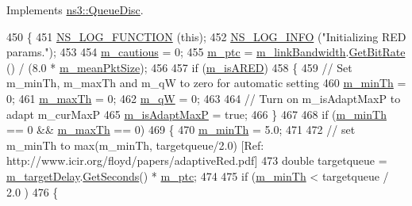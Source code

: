 Implements \hyperlink{classns3_1_1QueueDisc_a600ed3e7110b9d506b28ad62beb84592}{ns3\+::\+Queue\+Disc}.


\begin{DoxyCode}
450 \{
451   \hyperlink{log-macros-disabled_8h_a90b90d5bad1f39cb1b64923ea94c0761}{NS\_LOG\_FUNCTION} (\textcolor{keyword}{this});
452   \hyperlink{group__logging_gafbd73ee2cf9f26b319f49086d8e860fb}{NS\_LOG\_INFO} (\textcolor{stringliteral}{"Initializing RED params."});
453 
454   \hyperlink{classns3_1_1RedQueueDisc_a2156a26538fe0259220ca9e57c829c34}{m\_cautious} = 0;
455   \hyperlink{classns3_1_1RedQueueDisc_aa0e1d78172897574d39e59b873ec9401}{m\_ptc} = \hyperlink{classns3_1_1RedQueueDisc_a036e8100b2bc17d9b7c3bf5184126f95}{m\_linkBandwidth}.\hyperlink{classns3_1_1DataRate_a88e27dcc6e633584dac99fa5988612bc}{GetBitRate} () / (8.0 * 
      \hyperlink{classns3_1_1RedQueueDisc_a70edac67edac4ce7c4a7d4325cf1e409}{m\_meanPktSize});
456 
457   \textcolor{keywordflow}{if} (\hyperlink{classns3_1_1RedQueueDisc_a27b33901dccd8e52d8cbe9798ea70139}{m\_isARED})
458     \{
459       \textcolor{comment}{// Set m\_minTh, m\_maxTh and m\_qW to zero for automatic setting}
460       \hyperlink{classns3_1_1RedQueueDisc_a6c2f13710a589ca7a43e06d16bd889ee}{m\_minTh} = 0;
461       \hyperlink{classns3_1_1RedQueueDisc_a631761d4c950b0408ba26f42a0509c42}{m\_maxTh} = 0;
462       \hyperlink{classns3_1_1RedQueueDisc_aed406d18723a07fe991497553abed6da}{m\_qW} = 0;
463 
464       \textcolor{comment}{// Turn on m\_isAdaptMaxP to adapt m\_curMaxP}
465       \hyperlink{classns3_1_1RedQueueDisc_a1bb942ecdce8c8c2eb9953f67ae9a0da}{m\_isAdaptMaxP} = \textcolor{keyword}{true};
466     \}
467 
468   \textcolor{keywordflow}{if} (\hyperlink{classns3_1_1RedQueueDisc_a6c2f13710a589ca7a43e06d16bd889ee}{m\_minTh} == 0 && \hyperlink{classns3_1_1RedQueueDisc_a631761d4c950b0408ba26f42a0509c42}{m\_maxTh} == 0)
469     \{
470       \hyperlink{classns3_1_1RedQueueDisc_a6c2f13710a589ca7a43e06d16bd889ee}{m\_minTh} = 5.0;
471 
472       \textcolor{comment}{// set m\_minTh to max(m\_minTh, targetqueue/2.0) [Ref:
       http://www.icir.org/floyd/papers/adaptiveRed.pdf]}
473       \textcolor{keywordtype}{double} targetqueue = \hyperlink{classns3_1_1RedQueueDisc_aa0467c2e9ccdeb445fcd5e876669a3f2}{m\_targetDelay}.\hyperlink{classns3_1_1Time_a8f20d5c3b0902d7b4320982f340b57c8}{GetSeconds}() * 
      \hyperlink{classns3_1_1RedQueueDisc_aa0e1d78172897574d39e59b873ec9401}{m\_ptc};
474 
475       \textcolor{keywordflow}{if} (\hyperlink{classns3_1_1RedQueueDisc_a6c2f13710a589ca7a43e06d16bd889ee}{m\_minTh} < targetqueue / 2.0 )
476         \{

\end{DoxyCode}
